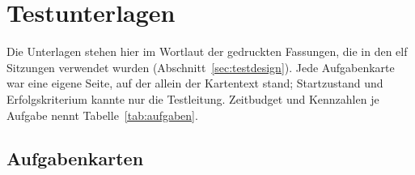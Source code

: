 
\chapter{Testunterlagen}
\label{anh:testunterlagen}

Die Unterlagen stehen hier im Wortlaut der gedruckten Fassungen, die in den elf Sitzungen verwendet wurden (Abschnitt~\ref{sec:testdesign}). Jede Aufgabenkarte war eine eigene Seite, auf der allein der Kartentext stand; Startzustand und Erfolgskriterium kannte nur die Testleitung. Zeitbudget und Kennzahlen je Aufgabe nennt Tabelle~\ref{tab:aufgaben}.

\section*{Aufgabenkarten}

